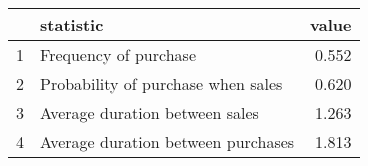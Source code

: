 \begin{tabular}{rlr}
  \hline
 & statistic & value \\ 
  \hline
1 & Frequency of purchase & 0.552 \\ 
  2 & Probability of purchase when sales & 0.620 \\ 
  3 & Average duration between sales & 1.263 \\ 
  4 & Average duration between purchases & 1.813 \\ 
   \hline
\end{tabular}
